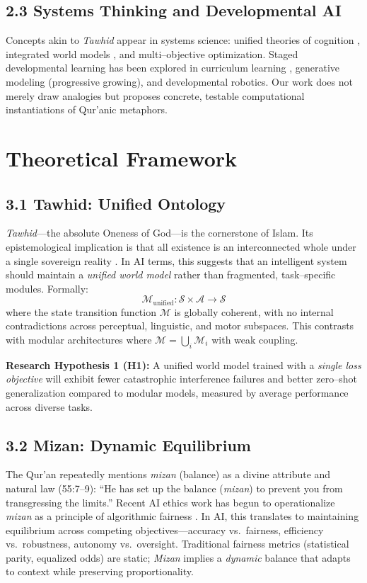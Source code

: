 \documentclass[12pt,twocolumn]{article}
\begin{document}
\subsection*{2.3 Systems Thinking and Developmental AI}
Concepts akin to \emph{Tawhid} appear in systems science: unified theories of cognition \citep{Newell1990}, integrated world models \citep{LeCun2022}, and multi--objective optimization. Staged developmental learning has been explored in curriculum learning \citep{Bengio2009}, generative modeling (progressive growing), and developmental robotics. Our work does not merely draw analogies but proposes concrete, testable computational instantiations of Qur'anic metaphors.

\section{Theoretical Framework}
\subsection*{3.1 Tawhid: Unified Ontology}
\textit{Tawhid}—the absolute Oneness of God—is the cornerstone of Islam. Its epistemological implication is that all existence is an interconnected whole under a single sovereign reality \citep{Choudhury2019}. In AI terms, this suggests that an intelligent system should maintain a \emph{unified world model} rather than fragmented, task--specific modules. Formally:
\begin{equation}
\mathcal{M}_{\text{unified}} : \mathcal{S} \times \mathcal{A} \rightarrow \mathcal{S}
\end{equation}
where the state transition function $\mathcal{M}$ is globally coherent, with no internal contradictions across perceptual, linguistic, and motor subspaces. This contrasts with modular architectures where $\mathcal{M} = \bigcup_i \mathcal{M}_i$ with weak coupling.

\textbf{Research Hypothesis 1 (H1):} A unified world model trained with a \emph{single loss objective} will exhibit fewer catastrophic interference failures and better zero--shot generalization compared to modular models, measured by average performance across diverse tasks.

\subsection*{3.2 Mizan: Dynamic Equilibrium}
The Qur'an repeatedly mentions \emph{mizan} (balance) as a divine attribute and natural law (55:7--9): ``He has set up the balance (\emph{mizan}) to prevent you from transgressing the limits.'' Recent AI ethics work has begun to operationalize \emph{mizan} as a principle of algorithmic fairness \citep{Nikmah2025,Din2025}. In AI, this translates to maintaining equilibrium across competing objectives—accuracy vs.\ fairness, efficiency vs.\ robustness, autonomy vs.\ oversight. Traditional fairness metrics (statistical parity, equalized odds) are static; \emph{Mizan} implies a \emph{dynamic} balance that adapts to context while preserving proportionality.
\end{document}
